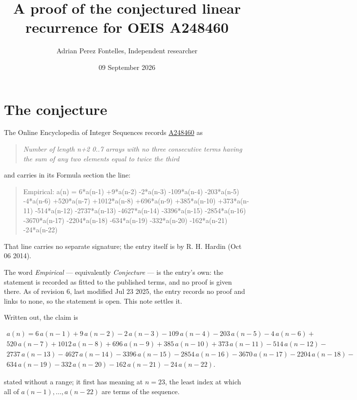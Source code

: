 \documentclass[11pt]{article}
\title{A proof of the conjectured linear recurrence for OEIS A248460}
\author{Adrian Perez Fontelles, Independent researcher}
\date{09 September 2026}
\theoremstyle{definition}
\begin{document}
\maketitle
\section{The conjecture}

The Online Encyclopedia of Integer Sequences records \href{https://oeis.org/A248460}{A248460} as

\begin{quote}\itshape Number of length n+2 0..7 arrays with no three consecutive terms having the sum of any two elements equal to twice the third\end{quote}

and carries in its Formula section the line:

\begin{quote}\ttfamily Empirical: a(n) = 6*a(n-1) +9*a(n-2) -2*a(n-3) -109*a(n-4) -203*a(n-5) -4*a(n-6) +520*a(n-7) +1012*a(n-8) +696*a(n-9) +385*a(n-10) +373*a(n-11) -514*a(n-12) -2737*a(n-13) -4627*a(n-14) -3396*a(n-15) -2854*a(n-16) -3670*a(n-17) -2204*a(n-18) -634*a(n-19) -332*a(n-20) -162*a(n-21) -24*a(n-22)\end{quote}

That line carries no separate signature; the entry itself is by R. H. Hardin (Oct 06 2014).

The word {\itshape Empirical} --- equivalently {\itshape Conjecture} --- is the entry's own: the statement is recorded as fitted to the published terms, and no proof is given there. As of revision 6, last modified Jul 23 2025, the entry records no proof and links to none, so the statement is open. This note settles it.

Written out, the claim is

\begin{multline*} a(n) = 6\,a(n-1) + 9\,a(n-2) - 2\,a(n-3) - 109\,a(n-4) - 203\,a(n-5) - 4\,a(n-6) + \\ 520\,a(n-7) + 1012\,a(n-8) + 696\,a(n-9) + 385\,a(n-10) + 373\,a(n-11) - 514\,a(n-12) - \\ 2737\,a(n-13) - 4627\,a(n-14) - 3396\,a(n-15) - 2854\,a(n-16) - 3670\,a(n-17) - 2204\,a(n-18) - \\ 634\,a(n-19) - 332\,a(n-20) - 162\,a(n-21) - 24\,a(n-22). \end{multline*}

stated without a range; it first has meaning at $n = 23$, the least index at which all of $a(n-1),\dots,a(n-22)$ are terms of the sequence.
\end{document}
